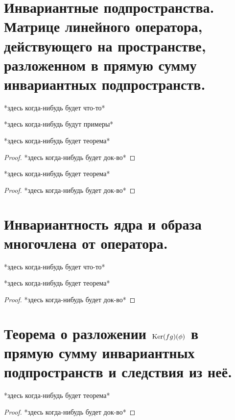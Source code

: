 \documentclass[algebra]{subfiles}
\begin{document}
    \section{Инвариантные подпространства. Матрице линейного оператора, действующего на пространстве, разложенном в прямую сумму инвариантных подпространств.}
    *здесь когда-нибудь будет что-то*
    \begin{examples}
      *здесь когда-нибудь будут примеры*
    \end{examples}

    \begin{theorem}[1]
      *здесь когда-нибудь будет теорема*
    \end{theorem}

    \begin{proof}
      *здесь когда-нибудь будет док-во*
    \end{proof}

    \begin{theorem}[2]
      *здесь когда-нибудь будет теорема*
    \end{theorem}

    \begin{proof}
      *здесь когда-нибудь будет док-во*
    \end{proof}

    \section{Инвариантность ядра и образа многочлена от оператора.}
    *здесь когда-нибудь будет что-то*
    \begin{theorem}
      *здесь когда-нибудь будет теорема*
    \end{theorem}

    \begin{proof}
      *здесь когда-нибудь будет док-во*
    \end{proof}

    \section{Теорема о разложении $\mathop{\rm Ker}\nolimits(f g)(\phi)$ в прямую сумму инвариантных подпространств и следствия из неё.}

    \begin{theorem}
      *здесь когда-нибудь будет теорема*
    \end{theorem}

    \begin{proof}
      *здесь когда-нибудь будет док-во*
    \end{proof}
\end{document}
